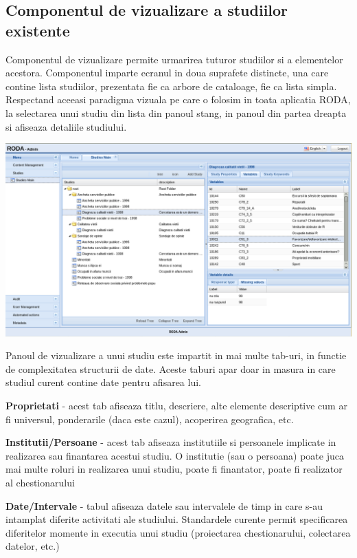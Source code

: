 \subsection{Componentul de vizualizare a studiilor existente}

Componentul de vizualizare permite urmarirea tuturor studiilor si a elementelor acestora. Componentul imparte ecranul in doua suprafete distincte, una care contine lista studiilor, prezentata fie ca arbore de cataloage, fie ca lista simpla. Respectand aceeasi paradigma vizuala pe care o folosim in toata aplicatia RODA, la selectarea unui studiu din lista din panoul stang, in panoul din partea dreapta si afiseaza detaliile studiului. 

\includegraphics[width=16cm]{img/study-tree-compl}

Panoul de vizualizare a unui studiu este impartit in mai multe tab-uri, in functie de complexitatea structurii de date. Aceste taburi apar doar in masura in care studiul curent contine date pentru afisarea lui. 
 
\textbf{Proprietati} - acest tab afiseaza titlu, descriere, alte elemente descriptive cum ar fi universul, ponderarile (daca este cazul), acoperirea geografica, etc. 

\textbf{Institutii/Persoane} - acest tab afiseaza institutiile si persoanele implicate in realizarea sau finantarea acestui studiu. O institutie (sau o persoana) poate juca mai multe roluri in realizarea unui studiu, poate fi finantator, poate fi realizator al chestionarului

\textbf{Date/Intervale} - tabul afiseaza datele sau intervalele de timp in care s-au intamplat diferite activitati ale studiului. Standardele curente     permit specificarea diferitelor momente in executia unui studiu (proiectarea chestionarului, colectarea datelor, etc.)

